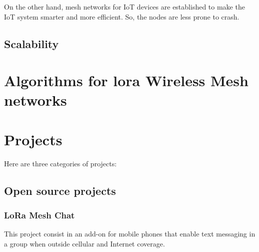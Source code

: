 			On the other hand, mesh networks for IoT devices are established to make the IoT system smarter and more efficient. So, the nodes are less prone to crash.
	
		\subsection{Scalability}
		
			
			
	
	\section{Algorithms for lora Wireless Mesh networks}
	
	
	\section{Projects}\label{sec:chap4_projects}
		
		Here are three categories of projects:
		
		\subsection{Open source projects}
		
			\subsubsection{LoRa Mesh Chat}\label{subsubsec:lorameshchat}

				This project consist in an add-on for mobile phones that enable text messaging in a group when outside cellular and Internet coverage.		
					
